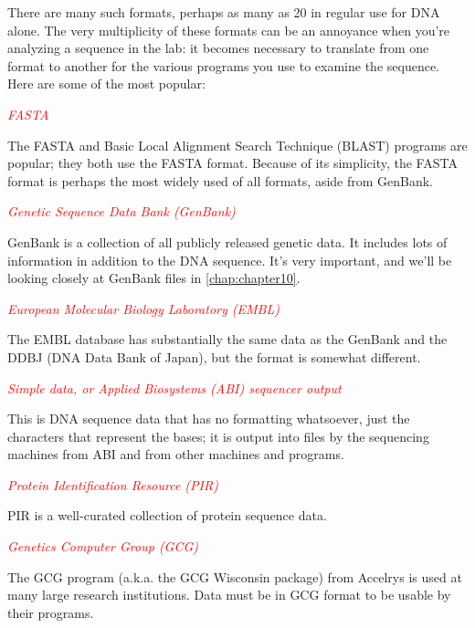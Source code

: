 There are many such formats, perhaps as many as 20 in regular use for DNA alone. The very multiplicity of these formats can be an annoyance when you're analyzing a sequence in the lab: it becomes necessary to translate from one format to another for the various programs you use to examine the sequence. Here are some of the most popular: 

\textcolor{red}{\textit{FASTA}}
\begin{adjustwidth}{1cm}{}
The FASTA and Basic Local Alignment Search Technique (BLAST) programs are popular; they both use the FASTA format. Because of its simplicity, the FASTA format is perhaps the most widely used of all formats, aside from GenBank. 
\end{adjustwidth}

\textcolor{red}{\textit{Genetic Sequence Data Bank (GenBank)}}
\begin{adjustwidth}{1cm}{}
GenBank is a collection of all publicly released genetic data. It includes lots of information in addition to the DNA sequence. It's very important, and we'll be looking closely at GenBank files in \autoref{chap:chapter10}. 
\end{adjustwidth}

\textcolor{red}{\textit{European Molecular Biology Laboratory (EMBL)}}
\begin{adjustwidth}{1cm}{}
The EMBL database has substantially the same data as the GenBank and the DDBJ (DNA Data Bank of Japan), but the format is somewhat different. 
\end{adjustwidth}

\textcolor{red}{\textit{Simple data, or Applied Biosystems (ABI) sequencer output}}
\begin{adjustwidth}{1cm}{}
This is DNA sequence data that has no formatting whatsoever, just the characters that represent the bases; it is output into files by the sequencing machines from ABI and from other machines and programs. 
\end{adjustwidth}

\textcolor{red}{\textit{Protein Identification Resource (PIR)}}
\begin{adjustwidth}{1cm}{}
PIR is a well-curated collection of protein sequence data.
\end{adjustwidth}

\textcolor{red}{\textit{Genetics Computer Group (GCG)}}
\begin{adjustwidth}{1cm}{}
The GCG program (a.k.a. the GCG Wisconsin package) from Accelrys is used at many large research institutions. Data must be in GCG format to be usable by their programs. 
\end{adjustwidth}

